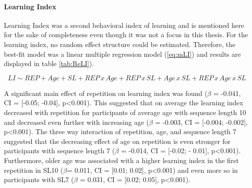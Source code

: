 
\paragraph{Learning Index}
Learning Index was a second behavioral index of learning and is mentioned here for the sake of completeness even though it was not a focus in this thesis.
For the learning index, no random effect structure could be estimated. Therefore, the best-fit model was a linear multiple regression model (\ref{eq:mLI}) and results are displayed in table \ref{tab:ReLI}).

\begin{equation}\label{eq:mLI}
LI \sim REP + Age + SL + REP\,x\,Age + REP\,x\,SL + Age\,x\,SL + REP\,x\,Age\,x\,SL
\end{equation}

A significant main effect of repetition on learning index was found ($\beta$ = -0.041, CI = [-0.05; -0.04], p<0.001). This suggested that on average the learning index decreased with repetition for participants of average age with sequence length 10 and decreased even further with increasing age ($\beta$ = -0.003, CI = [-0.004; -0.002], p<0.001). The three way interaction of repetition, age, and sequence length 7 suggested that the decreasing effect of age on repetition is even stronger for participants with sequence length 7 ($\beta$ = -0.014, CI = [-0.02; - 0.01], p<0.001). Furthermore, older age was associated with a higher learning index in the first repetition in SL10 ($\beta$= 0.011, CI = [0.01; 0.02], p<0.001) and even more so in participants with SL7 ($\beta$ = 0.031, CI = [0.02; 0.05], p<0.001). 

